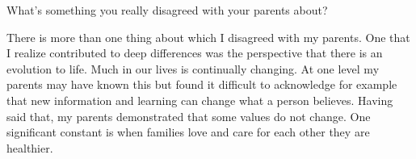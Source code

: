 What's something you really disagreed with your parents about?

There is more than one thing about which I disagreed with my parents.
One that I realize contributed to deep differences was the perspective that there is an evolution to life.
Much in our lives is continually changing.
At one level my parents may have known this but found it difficult to acknowledge for example that new information and learning can change what a person believes.
Having said that, my parents demonstrated that some values do not change.
One significant constant is when families love and care for each other they are healthier.





